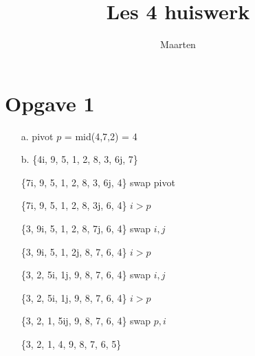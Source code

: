 \documentclass[12pt,a4paper]{article}
\title{Les 4 huiswerk}
\author{Maarten}
\begin{document}
\maketitle

\section{Opgave 1}
\begin{itemize}
\item[a.] pivot $p$ = mid(4,7,2) = 4
\item[b.] \{4i, 9, 5, 1, 2, 8, 3, 6j, 7\}
\item[] \{7i, 9, 5, 1, 2, 8, 3, 6j, 4\} swap pivot
\item[] \{7i, 9, 5, 1, 2, 8, 3j, 6, 4\} $i>p$
\item[] \{3, 9i, 5, 1, 2, 8, 7j, 6, 4\} swap $i,j$
\item[] \{3, 9i, 5, 1, 2j, 8, 7, 6, 4\} $i>p$
\item[] \{3, 2, 5i, 1j, 9, 8, 7, 6, 4\} swap $i,j$
\item[] \{3, 2, 5i, 1j, 9, 8, 7, 6, 4\} $i>p$
\item[] \{3, 2, 1, 5ij, 9, 8, 7, 6, 4\} swap $p,i$
\item[] \{3, 2, 1, 4, 9, 8, 7, 6, 5\}
\end{itemize}
\end{document}
